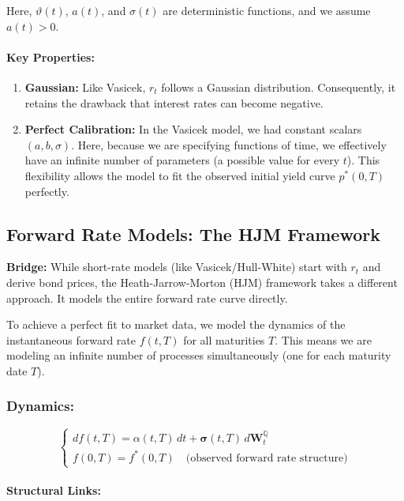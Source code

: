 \documentclass[12pt,a4paper]{article}
\theoremstyle{definition}
\newcommand{\Q}{\mathbb{Q}}
\begin{document}
Here, $\vartheta(t)$, $a(t)$, and $\sigma(t)$ are deterministic functions, and we assume $a(t) > 0$.

\paragraph{Key Properties:}

\begin{enumerate}
\item \textbf{Gaussian:} Like Vasicek, $r_t$ follows a Gaussian distribution. Consequently, it retains the drawback that interest rates can become negative.

\item \textbf{Perfect Calibration:} In the Vasicek model, we had constant scalars $(a,b,\sigma)$. Here, because we are specifying functions of time, we effectively have an infinite number of parameters (a possible value for every $t$). This flexibility allows the model to fit the observed initial yield curve $p^*(0,T)$ perfectly.
\end{enumerate}

\subsection{Forward Rate Models: The HJM Framework}

\textbf{Bridge:} While short-rate models (like Vasicek/Hull-White) start with $r_t$ and derive bond prices, the Heath-Jarrow-Morton (HJM) framework takes a different approach. It models the entire forward rate curve directly.

To achieve a perfect fit to market data, we model the dynamics of the instantaneous forward rate $f(t,T)$ for all maturities $T$. This means we are modeling an infinite number of processes simultaneously (one for each maturity date $T$).

\subsubsection{Dynamics:}

\[
\begin{cases}
df(t,T) = \alpha(t,T)\,dt + \boldsymbol{\sigma}(t,T)\,d\boldsymbol{W}_t^{\Q} \\
f(0,T) = f^*(0,T) \quad \text{(observed forward rate structure)}
\end{cases}
\]

\paragraph{Structural Links:}
\end{document}
